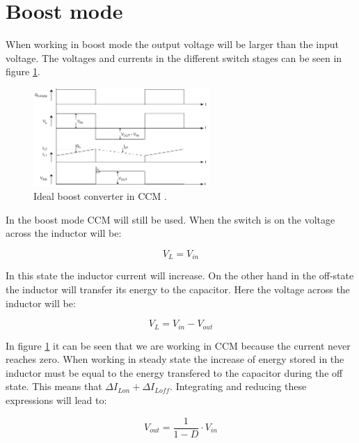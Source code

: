 \section{Boost mode}
When working in boost mode the output voltage will be larger than the input voltage. The voltages and currents in the different switch stages can be seen in figure \ref{CCM_boost}. 

\begin{figure}[H]
	\begin{center}
		\includegraphics[width=0.6\textwidth]{../Pictures/P1/Appendix/boost_currents}
		\caption{Ideal boost converter in CCM \cite{AN1114_MC}.}
		\label{CCM_boost}
	\end{center}	
\end{figure}
In the boost mode CCM will still be used. When the switch is on the voltage across the inductor will be:

\begin{equation}
V_L = V_{in}
\end{equation}

In this state the inductor current will increase. On the other hand in the off-state the inductor will transfer its energy to the capacitor. Here the voltage across the inductor will be:

\begin{equation}
V_L = V_{in}-V_{out}
\end{equation}

In figure \ref{CCM_boost} it can be seen that we are working in CCM because the current never reaches zero. 
When working in steady state the increase of energy stored in the inductor must be equal to the energy transfered to the capacitor during the off state. This means that $\Delta I_{Lon}+\Delta I_{Loff}$. Integrating and reducing these expressions will lead to:

\begin{equation}
V_{out} = \frac{1}{1-D}\cdot V_{in}
\end{equation}
 

